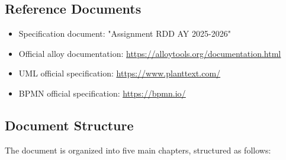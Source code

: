 \subsection{Reference Documents}
\begin{itemize}
        \item Specification document: "Assignment RDD AY 2025-2026"
        \item Official alloy documentation: \underline{\url{https://alloytools.org/documentation.html}}
        \item UML official specification: \underline{\url{https://www.planttext.com/}}
        \item BPMN official specification: \underline{\url{https://bpmn.io/}}
\end{itemize}
\subsection{Document Structure}
The document is organized into five main chapters, structured as follows:
